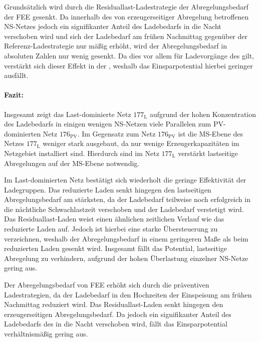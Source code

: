 

Grundsätzlich wird durch die Residuallast-Ladestrategie der Abregelungsbedarf der \gls{FEE} gesenkt.
Da innerhalb des von erzeugerseitiger Abregelung betroffenen \gls{NS}-Netzes jedoch ein signifikanter Anteil des Ladebedarfs in die Nacht verschoben wird und sich der Ladebedarf am frühen Nachmittag gegenüber der Referenz-Ladestrategie nur mäßig erhöht, wird der Abregelungsbedarf in absoluten Zahlen nur wenig gesenkt.
Da dies vor allem für Ladevorgänge des \UC \zH gilt, verstärkt sich dieser Effekt in der \SzeFirmenparkplatzdot, weshalb das Einsparpotential hierbei geringer ausfällt.


\paragraph{Fazit:}

Insgesamt zeigt das Last-dominierte Netz \(177_{\text{L}}\) aufgrund der hohen Konzentration des Ladebedarfs in einigen wenigen \gls{NS}-Netzen viele Parallelen zum \gls{PV}-dominierten Netz \(176_{\text{PV}}\).
Im Gegensatz zum Netz \(176_{\text{PV}}\) ist die \gls{MS}-Ebene des Netzes \(177_{\text{L}}\) weniger stark ausgebaut, da nur wenige Erzeugerkapazitäten im Netzgebiet installiert sind.
Hierdurch sind im Netz \(177_{\text{L}}\) verstärkt lastseitige Abregelungen auf der \gls{MS}-Ebene notwendig.

Im Last-dominierten Netz bestätigt sich wiederholt die geringe Effektivität der Ladegruppen.
Das reduzierte Laden senkt hingegen den lastseitigen Abregelungsbedarf am stärksten, da der Ladebedarf teilweise noch erfolgreich in die nächtliche Schwachlastzeit verschoben und der Ladebedarf verstetigt wird.
Das Residuallast-Laden weist einen ähnlichen zeitlichen Verlauf wie das reduzierte Laden auf.
Jedoch ist hierbei eine starke Übersteuerung zu verzeichnen, weshalb der Abregelungsbedarf in einem geringeren Maße als beim reduzierten Laden gesenkt wird.
Insgesamt fällt das Potential, lastseitige Abregelung zu verhindern, aufgrund der hohen Überlastung einzelner \gls{NS}-Netze gering aus.

Der Abregelungsbedarf von \gls{FEE} erhöht sich durch die präventiven Ladestrategien, da der Ladebedarf in den Hochzeiten der Einspeisung am frühen Nachmittag reduziert wird.
Das Residuallast-Laden senkt hingegen den erzeugerseitigen Abregelungsbedarf.
Da jedoch ein signifikanter Anteil des Ladebedarfs des \UC \zH in die Nacht verschoben wird, fällt das Einsparpotential verhältnismäßig gering aus.

\clearpage
